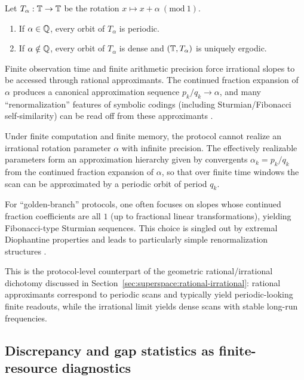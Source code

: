 \begin{proposition}\label{prop:circle-periodic-dense}
Let $T_\alpha:\mathbb{T}\to\mathbb{T}$ be the rotation $x\mapsto x+\alpha \ (\mathrm{mod}\ 1)$.
\begin{enumerate}[label=(\roman*),leftmargin=*,itemsep=2pt]
  \item If $\alpha\in\mathbb{Q}$, every orbit of $T_\alpha$ is periodic.
  \item If $\alpha\notin\mathbb{Q}$, every orbit of $T_\alpha$ is dense and $(\mathbb{T},T_\alpha)$ is uniquely ergodic.
\end{enumerate}
\cite{Walters1982}
\end{proposition}

Finite observation time and finite arithmetic precision force irrational slopes to be accessed through rational approximants. The continued fraction expansion of $\alpha$ produces a canonical approximation sequence $p_k/q_k\to\alpha$, and many ``renormalization'' features of symbolic codings (including Sturmian/Fibonacci self-similarity) can be read off from these approximants \cite{Queffelec2010}.

\begin{assumption}\label{assump:finite-resource}
Under finite computation and finite memory, the protocol cannot realize an irrational rotation parameter $\alpha$ with infinite precision. The effectively realizable parameters form an approximation hierarchy given by convergents $\alpha_k=p_k/q_k$ from the continued fraction expansion of $\alpha$, so that over finite time windows the scan can be approximated by a periodic orbit of period $q_k$.
\end{assumption}

For ``golden-branch'' protocols, one often focuses on slopes whose continued fraction coefficients are all $1$ (up to fractional linear transformations), yielding Fibonacci-type Sturmian sequences. This choice is singled out by extremal Diophantine properties and leads to particularly simple renormalization structures \cite{KuipersNiederreiter1974,Queffelec2010}.

This is the protocol-level counterpart of the geometric rational/irrational dichotomy discussed in Section~\ref{sec:superspace:rational-irrational}: rational approximants correspond to periodic scans and typically yield periodic-looking finite readouts, while the irrational limit yields dense scans with stable long-run frequencies.

\subsection{Discrepancy and gap statistics as finite-resource diagnostics}\label{sec:readout:discrepancy}

